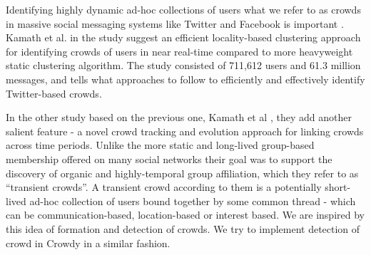 \documentclass{sig-alternate}
\begin{document}
Identifying highly dynamic ad-hoc collections of users what we refer to as
crowds in massive social messaging systems like Twitter and Facebook is
important \cite{krishna:2010}. Kamath et al. in the study suggest an
efficient locality-based clustering approach for identifying crowds of users in
near real-time compared to more heavyweight static clustering algorithm. The
study consisted of 711,612 users and 61.3 million messages, and tells what
approaches to follow to efficiently and effectively identify Twitter-based
crowds.

In the other study based on the previous one, Kamath et al
\cite{krishna:2011}, they add another salient feature - a novel crowd tracking
and evolution approach for linking crowds across time periods. Unlike the more
static and long-lived group-based membership offered on many social networks
their goal was to support the discovery of organic and highly-temporal group
affiliation, which they refer to as ``transient crowds''. A transient crowd
according to them is a potentially short-lived ad-hoc collection of users bound
together by some common thread - which can be communication-based,
location-based or interest based. We are inspired by this idea of formation and
detection of crowds. We try to implement detection of crowd in Crowdy in a
similar fashion.
\end{document}

